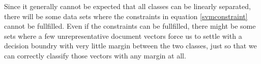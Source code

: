 Since it generally cannot be expected that all classes can be linearly separated, there will be some data sets where the constraints in equation \ref{svmconstraint} cannot be fullfilled. Even if the constraints can be fullfilled, there might be some sets where a few unrepresentative document vectors force us to settle with a decision boundry with very little margin between the two classes, just so that we can correctly classify those vectors with any margin at all. 
